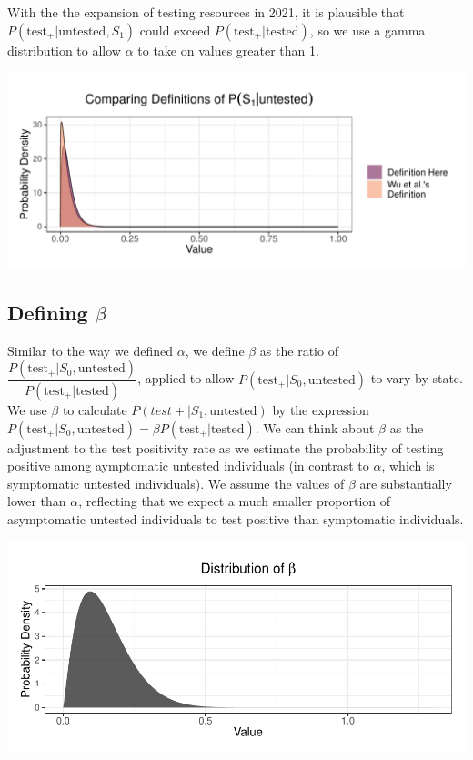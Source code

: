 \documentclass[12pt,twoside]{smiththesis}
\begin{document}
With the the expansion of testing resources in 2021, it is plausible that \(P(\text{test}_+|\text{untested},S_1)\) could exceed \(P(\text{test}_+|\text{tested})\), so we use a gamma distribution to allow \(\alpha\) to take on values greater than 1.
\begin{center}\includegraphics[width=0.8\linewidth]{thesis_files/figure-latex/unnamed-chunk-55-1} \end{center}

\hypertarget{defining-beta}{%
\subsection{\texorpdfstring{Defining \(\beta\)}{Defining \textbackslash beta}}\label{defining-beta}}

Similar to the way we defined \(\alpha\), we define \(\beta\) as the ratio of \(\dfrac{P(\text{test}_+ |S_0, \text{untested})}{P(\text{test}_+|\text{tested})}\), applied to allow \(P(\text{test}_+ |S_0, \text{untested})\) to vary by state. We use \(\beta\) to calculate \(P(test+|S_1, \text{untested})\) by the expression \(P(\text{test}_+|S_0, \text{untested}) =\beta P(\text{test}_+|\text{tested})\). We can think about \(\beta\) as the adjustment to the test positivity rate as we estimate the probability of testing positive among aymptomatic untested individuals (in contrast to \(\alpha\), which is symptomatic untested individuals). We assume the values of \(\beta\) are substantially lower than \(\alpha\), reflecting that we expect a much smaller proportion of asymptomatic untested individuals to test positive than symptomatic individuals.
\begin{center}\includegraphics[width=0.8\linewidth]{thesis_files/figure-latex/unnamed-chunk-56-1} \end{center}
\end{document}
